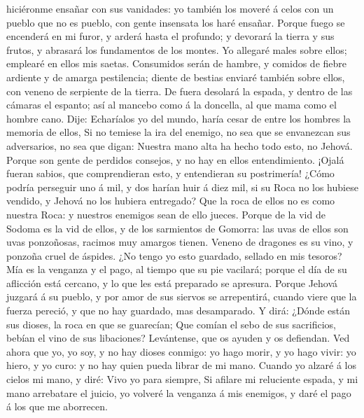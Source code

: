 hiciéronme ensañar con sus vanidades: yo también los moveré á celos con
un pueblo que no es pueblo, con gente insensata los haré ensañar.
 Porque fuego se encenderá en mi furor, y arderá hasta el
profundo; y devorará la tierra y sus frutos, y abrasará los fundamentos
de los montes.  Yo allegaré males sobre ellos; emplearé
en ellos mis saetas.  Consumidos serán de hambre, y
comidos de fiebre ardiente y de amarga pestilencia; diente de bestias
enviaré también sobre ellos, con veneno de serpiente de la tierra.
 De fuera desolará la espada, y dentro de las cámaras el
espanto; así al mancebo como á la doncella, al que mama como el hombre
cano.  Dije: Echaríalos yo del mundo, haría cesar de
entre los hombres la memoria de ellos,  Si no temiese la
ira del enemigo, no sea que se envanezcan sus adversarios, no sea que
digan: Nuestra mano alta ha hecho todo esto, no Jehová. 
Porque son gente de perdidos consejos, y no hay en ellos entendimiento.
 ¡Ojalá fueran sabios, que comprendieran esto, y
entendieran su postrimería!  ¿Cómo podría perseguir uno á
mil, y dos harían huir á diez mil, si su Roca no los hubiese vendido, y
Jehová no los hubiera entregado?  Que la roca de ellos no
es como nuestra Roca: y nuestros enemigos sean de ello jueces.
 Porque de la vid de Sodoma es la vid de ellos, y de los
sarmientos de Gomorra: las uvas de ellos son uvas ponzoñosas, racimos
muy amargos tienen.  Veneno de dragones es su vino, y
ponzoña cruel de áspides.  ¿No tengo yo esto guardado,
sellado en mis tesoros?  Mía es la venganza y el pago, al
tiempo que su pie vacilará; porque el día de su aflicción está cercano,
y lo que les está preparado se apresura.  Porque Jehová
juzgará á su pueblo, y por amor de sus siervos se arrepentirá, cuando
viere que la fuerza pereció, y que no hay guardado, mas desamparado.
 Y dirá: ¿Dónde están sus dioses, la roca en que se
guarecían;  Que comían el sebo de sus sacrificios, bebían
el vino de sus libaciones? Levántense, que os ayuden y os defiendan.
 Ved ahora que yo, yo soy, y no hay dioses conmigo: yo
hago morir, y yo hago vivir: yo hiero, y yo curo: y no hay quien pueda
librar de mi mano.  Cuando yo alzaré á los cielos mi
mano, y diré: Vivo yo para siempre,  Si afilare mi
reluciente espada, y mi mano arrebatare el juicio, yo volveré la
venganza á mis enemigos, y daré el pago á los que me aborrecen.
